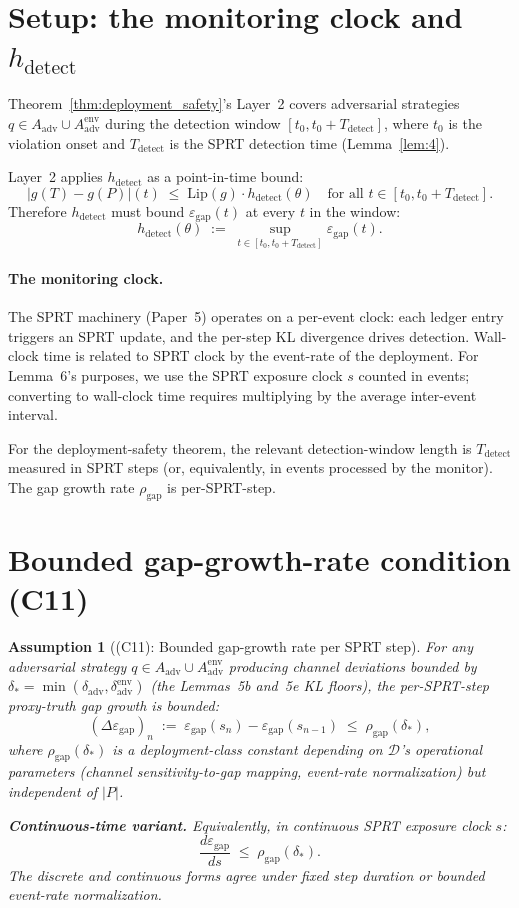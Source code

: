 \documentclass{article}
\newtheorem{assumption}{Assumption}
\newcommand{\Aadv}{A_{\mathrm{adv}}}
\newcommand{\deltaadv}{\delta_{\mathrm{adv}}}
\newcommand{\deltastar}{\delta_{*}}
\newcommand{\rhogap}{\rho_{\mathrm{gap}}}
\newcommand{\Pproxy}{P}
\newcommand{\Ttruth}{T}
\newcommand{\epsgap}{\varepsilon_{\mathrm{gap}}}
\begin{document}
\section{Setup: the monitoring clock and $h_{\mathrm{detect}}$}

Theorem~\ref{thm:deployment_safety}'s Layer~2 covers adversarial
strategies $q \in \Aadv \cup \Aadv^{\mathrm{env}}$ during the
detection window
$[t_0, t_0 + T_{\mathrm{detect}}]$, where $t_0$ is the violation
onset and $T_{\mathrm{detect}}$ is the SPRT detection time
(Lemma~\ref{lem:4}).

Layer~2 applies $h_{\mathrm{detect}}$ as a point-in-time bound:
\[
  |g(\Ttruth) - g(\Pproxy)|(t) \;\leq\; \mathrm{Lip}(g) \cdot
  h_{\mathrm{detect}}(\theta)
  \quad \text{for all } t \in [t_0, t_0 + T_{\mathrm{detect}}].
\]
Therefore $h_{\mathrm{detect}}$ must bound $\epsgap(t)$ at every
$t$ in the window:
\[
  h_{\mathrm{detect}}(\theta) \;:=\; \sup_{t \in
  [t_0, t_0 + T_{\mathrm{detect}}]} \epsgap(t).
\]

\paragraph{The monitoring clock.}
The SPRT machinery (Paper~5) operates on a per-event clock: each
ledger entry triggers an SPRT update, and the per-step KL
divergence drives detection.  Wall-clock time is related to SPRT
clock by the event-rate of the deployment.  For Lemma~6's purposes,
we use the SPRT exposure clock $s$ counted in events; converting
to wall-clock time requires multiplying by the average inter-event
interval.

For the deployment-safety theorem, the relevant detection-window
length is $T_{\mathrm{detect}}$ measured in SPRT steps (or,
equivalently, in events processed by the monitor).  The gap
growth rate $\rhogap$ is per-SPRT-step.

\section{Bounded gap-growth-rate condition (C11)}

\begin{assumption}[(C11): Bounded gap-growth rate per SPRT step]
\label{ass:C11}
For any adversarial strategy $q \in \Aadv \cup
\Aadv^{\mathrm{env}}$ producing channel deviations bounded by
$\deltastar = \min(\deltaadv, \delta_{\mathrm{adv}}^{\mathrm{env}})$
(the Lemmas~5b and~5e KL floors), the per-SPRT-step proxy-truth
gap growth is bounded:
\[
  (\Delta \epsgap)_n \;:=\; \epsgap(s_n) - \epsgap(s_{n-1}) \;\leq\;
  \rhogap(\deltastar),
\]
where $\rhogap(\deltastar)$ is a deployment-class constant
depending on $\mathcal{D}$'s operational parameters (channel
sensitivity-to-gap mapping, event-rate normalization) but
independent of $|P|$.

\textbf{Continuous-time variant.}  Equivalently, in continuous
SPRT exposure clock $s$:
\[
  \frac{d \epsgap}{ds} \;\leq\; \rhogap(\deltastar).
\]
The discrete and continuous forms agree under fixed step duration
or bounded event-rate normalization.
\end{assumption}
\end{document}
